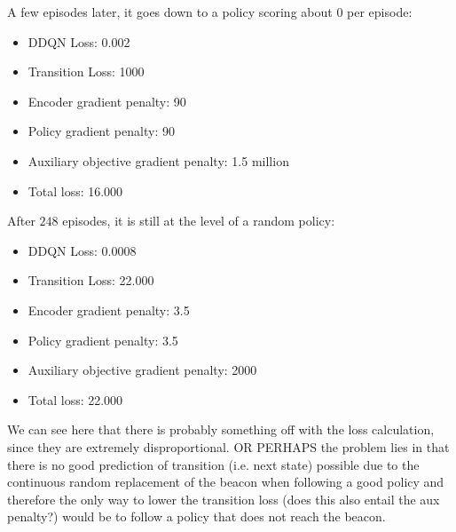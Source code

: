 A few episodes later, it goes down to a policy scoring about $0$ per episode:
\begin{itemize}
\item DDQN Loss: 0.002
\item Transition Loss: 1000
\item Encoder gradient penalty: 90
\item Policy gradient penalty: 90
\item Auxiliary objective gradient penalty: 1.5 million
\item Total loss: 16.000
\end{itemize}

After $248$ episodes, it is still at the level of a random policy:
\begin{itemize}
\item DDQN Loss: 0.0008 
\item Transition Loss: 22.000
\item Encoder gradient penalty: 3.5
\item Policy gradient penalty: 3.5
\item Auxiliary objective gradient penalty: 2000
\item Total loss: 22.000
\end{itemize}

We can see here that there is probably something off with the loss calculation, since they are extremely disproportional.
OR PERHAPS the problem lies in that there is no good prediction of transition (i.e. next state) possible due to the continuous random replacement of the beacon when following a good policy and therefore the only way to lower the transition loss (does this also entail the aux penalty?) would be to follow a policy that does not reach the beacon.